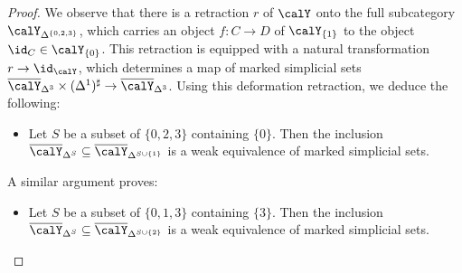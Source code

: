 \begin{proof}
We observe that there is a retraction $r$ of $\calY$ onto the full subcategory $\calY_{ \Delta^{ \{0,2,3\} } }$, which carries an object $f: C \rightarrow D$ of $\calY_{ \{1\} }$ to the object $\id_{C} \in \calY_{ \{0\} }$. 
This retraction is equipped with a natural transformation $r \rightarrow \id_{ \calY}$, which
determines a map of marked simplicial sets $\overline{\calY}_{\Delta^3} \times ( \Delta^1)^{\sharp}
\rightarrow \overline{\calY}_{\Delta^3}$. Using this deformation retraction, we deduce the following:
\begin{itemize}
\item[$(\ast)$] Let $S$ be a subset of $\{0,2,3\}$ containing $\{0\}$. Then the inclusion $\overline{\calY}_{ \Delta^{ S} } \subseteq \overline{\calY}_{ \Delta^{ S \cup \{1\} }}$ is a weak equivalence of marked simplicial sets.
\end{itemize}

A similar argument proves:
\begin{itemize}
\item[$(\ast')$] Let $S$ be a subset of $\{0,1,3\}$ containing $\{3\}$. Then the inclusion
$\overline{\calY}_{ \Delta^{S}} \subseteq \overline{\calY}_{ \Delta^{ S \cup \{2\} }}$
is a weak equivalence of marked simplicial sets.
\end{itemize}


\end{proof}
